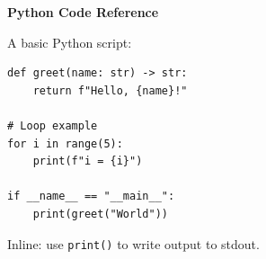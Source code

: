 \documentclass[11pt]{article}
\begin{document}
\centerline{\Large\bf Python Code Reference}\par
\bigskip

A basic Python script:

\begin{lstlisting}
def greet(name: str) -> str:
    return f"Hello, {name}!"

# Loop example
for i in range(5):
    print(f"i = {i}")

if __name__ == "__main__":
    print(greet("World"))
\end{lstlisting}

Inline: use \lstinline{print()} to write output to stdout.
\end{document}
